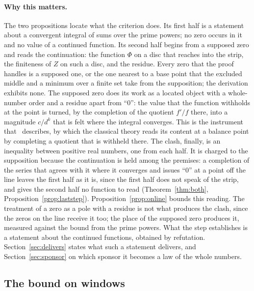 \documentclass[11pt]{article}
\theoremstyle{definition}
\theoremstyle{remark}
\begin{document}
\paragraph{Why this matters.} The two propositions locate what the criterion does. Its first half is a statement about a convergent integral of sums over the prime powers; no zero occurs in it and no value of a continued function. Its second half begins from a supposed zero and reads the continuation: the function $\Phi$ on a disc that reaches into the strip, the finiteness of $Z$ on such a disc, and the residue. Every zero that the proof handles is a supposed one, or the one nearest to a base point that the excluded middle and a minimum over a finite set take from the supposition; the derivation exhibits none. The supposed zero does its work as a located object with a whole-number order and a residue apart from ``0'': the value that the function withholds at the point is turned, by the completion of the quotient $f'/f$ there, into a magnitude $c/d^{k}$ that is felt where the integral converges. This is the instrument that~\citet{rhp} describes, by which the classical theory reads its content at a balance point by completing a quotient that is withheld there. The clash, finally, is an inequality between positive real numbers, one from each half. It is charged to the supposition because the continuation is held among the premises: a completion of the series that agrees with it where it converges and issues ``0'' at a point off the line leaves the first half as it is, since the first half does not speak of the strip, and gives the second half no function to read (Theorem~\ref{thm:both}, Proposition~\ref{prop:laststep}). Proposition~\ref{prop:online} bounds this reading. The treatment of a zero as a pole with a residue is not what produces the clash, since the zeros on the line receive it too; the place of the supposed zero produces it, measured against the bound from the prime powers. What the step establishes is a statement about the continued functions, obtained by refutation. Section~\ref{sec:delivers} states what such a statement delivers, and Section~\ref{sec:sponsor} on which sponsor it becomes a law of the whole numbers.

\subsection{The bound on windows}
\end{document}
